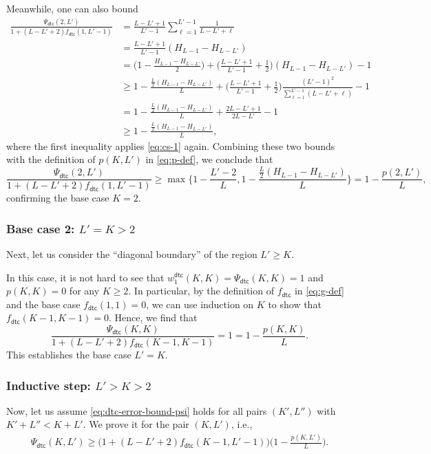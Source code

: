 \documentclass[english]{article}
\newcommand{\dtc}{\mathsf{dtc}}
\begin{document}
Meanwhile, one can also bound
\begin{align*}
\frac{\Psi_\dtc(2, L')}{1 + (L-L'+2)f_\dtc(1, L'-1)} &= \frac{L-L'+1}{L'-1} \sum_{\ell = 1}^{L'-1} \frac{1}{L-L'+\ell} \\
&= \frac{L-L'+1}{L'-1} (H_{L-1} - H_{L-L'} ) \\
&= \Big(1 - \frac{H_{L-1} - H_{L-L'} }{2}\Big) + \Big(\frac{L-L'+1}{L'-1} + \frac{1}{2}\Big)(H_{L-1} - H_{L-L'} ) - 1 \\
&\geq 1 - \frac{\frac{L}{2}(H_{L-1} - H_{L-L'} )}{L} + \Big(\frac{L-L'+1}{L'-1} + \frac{1}{2}\Big)\frac{(L'-1)^2}{\sum_{\ell = 1}^{L'-1}(L-L'+\ell)} - 1 \\
&= 1 - \frac{\frac{L}{2}(H_{L-1} - H_{L-L'} )}{L} + \frac{2L-L'+1}{2L-L'} - 1 \\
&\geq 1 - \frac{\frac{L}{2}(H_{L-1} - H_{L-L'} )}{L},
\end{align*}
where the first inequality applies \eqref{eq:cs-1} again.
Combining these two bounds with the definition of $p(K, L')$ in \eqref{eq:p-def}, we conclude that
\[
    \frac{\Psi_\dtc(2, L')}{1 + (L-L'+2)f_\dtc(1, L'-1)} \geq \max \bigg\{1 - \frac{L'-2}{L}, 1 - \frac{\frac{L}{2}(H_{L-1} - H_{L-L'} )}{L}\bigg\} = 1 - \frac{p(2, L')}{L},
\] 
 confirming the base case $K = 2$.

\subsubsection{Base case 2: $L' = K > 2$}
Next, let us consider the ``diagonal boundary'' of the region $L' \geq K$. 


In this case, it is not hard to see that $w_1^\dtc(K,K) =\Psi_\dtc(K, K) = 1$ and $p(K, K) = 0$ for any $K\geq 2$.
In particular, by the definition of $f_\dtc$ in \eqref{eq:g-def} and the base case $f_\dtc(1, 1) = 0$, we can use induction on $K$ to show that
$f_\dtc(K-1, K-1) = 0$. Hence, we find that
\[
    \frac{\Psi_\dtc(K, K)}{1 + (L-L'+2)f_\dtc(K-1, K-1)} 
     = 1 
    = 1 - \frac{p(K, K)}{L}.
\]
This establishes the base case $L' = K$.

\subsubsection{Inductive step: $L' > K > 2$}

Now, let us assume \eqref{eq:dtc-error-bound-psi} holds for all pairs $(K', L'')$ with $K' + L'' < K + L'$. We prove it for the pair $(K, L')$, i.e.,
\begin{align}\label{eq:g-bound-inductive-goal}
    \Psi_\dtc(K, L') \geq \big(1 + (L - L' + 2)f_\dtc(K-1, L'-1)\big) \bigg(1 - \frac{p(K, L')}{L} \bigg).
\end{align}
\end{document}

